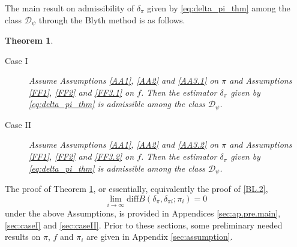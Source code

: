 \documentclass[preprint,11pt]{imsart}
\numberwithin{equation}{section}
\theoremstyle{plain}
\newtheorem{thm}{Theorem}[section]
\theoremstyle{definition}
\theoremstyle{remark}
\newcommand{\ndiff}{\mathrm{diff}B}
\begin{document}
The main result on admissibility of $\delta_\pi$ given by \eqref{eq:delta_pi_thm}
among the class $\mathcal{D}_\psi$ through
the Blyth method is as follows.
\begin{thm}\label{thm:mainmain}\mbox{}
\begin{description}
 \item[Case I]\label{thm:mainmain.1}  Assume Assumptions \ref{AA1}, \ref{AA2} and \ref{AA3.1} on $\pi$
and Assumptions \ref{FF1}, \ref{FF2} and \ref{FF3.1} on $f$.
	    Then the 
	    estimator $\delta_\pi$ given by \eqref{eq:delta_pi_thm}
	    is admissible among the class $\mathcal{D}_\psi$.
 \item[Case II]\label{thm:mainmain.2}  Assume Assumptions \ref{AA1}, \ref{AA2} and \ref{AA3.2} on $\pi$
and Assumptions \ref{FF1}, \ref{FF2} and \ref{FF3.2} on $f$.
	    Then the estimator
	    $\delta_\pi$ given by \eqref{eq:delta_pi_thm}
	    is admissible among the class $\mathcal{D}_\psi$.
\end{description}
\end{thm}
The proof of Theorem \ref{thm:mainmain}, or
essentially, equivalently the proof of \ref{BL.2},
\begin{equation*}
 \lim_{i\to \infty}\ndiff(\delta_\pi,\delta_{\pi i};\pi_i) =0
\end{equation*}
under the above Assumptions, is provided in Appendices \ref{sec:ap.pre.main}, \ref{sec:caseI} and \ref{sec:caseII}.
Prior to these sections, some preliminary needed results
on $\pi$, $f$ and $\pi_i$ are given in Appendix \ref{sec:assumption}.
\end{document}
